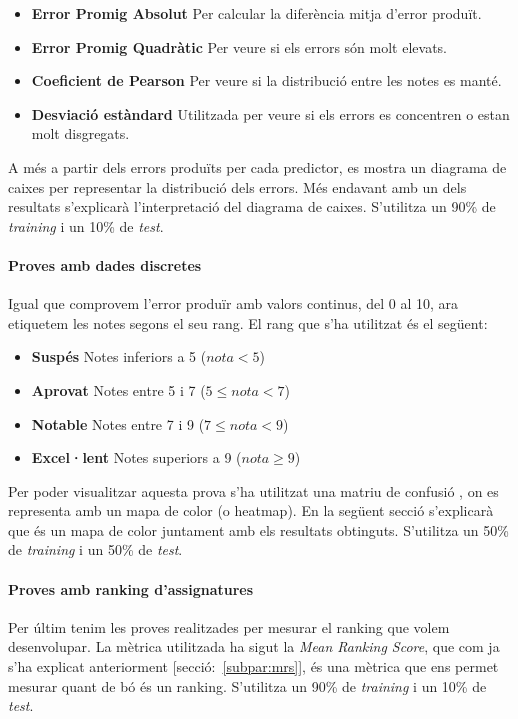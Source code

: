 \documentclass[12pt,a4paper,catalan]{article}
\begin{document}
\begin{itemize}[leftmargin=.5in]
	\item \textbf{Error Promig Absolut} Per calcular la diferència mitja d'error produït.
	\item \textbf{Error Promig Quadràtic} Per veure si els errors són molt elevats.
	\item \textbf{Coeficient de Pearson} Per veure si la distribució entre les notes es manté.
	\item \textbf{Desviació estàndard} Utilitzada per veure si els errors es concentren o estan molt disgregats.
\end{itemize}

A més a partir dels errors produïts per cada predictor, es mostra un diagrama de caixes \cite{boxplot} per representar la distribució dels errors. Més endavant amb un dels resultats s'explicarà l'interpretació del diagrama de caixes. S'utilitza un 90\% de \textit{training} i un 10\% de \textit{test}.


\paragraph{Proves amb dades discretes}
Igual que comprovem l'error produïr amb valors continus, del 0 al 10, ara etiquetem les notes segons el seu rang. El rang que s'ha utilitzat és el següent:

\begin{itemize}[leftmargin=.5in]
	\item \textbf{Suspés} Notes inferiors a 5 ($nota < 5$)
	\item \textbf{Aprovat} Notes entre 5 i 7 ($5 \leq nota < 7 $)
	\item \textbf{Notable} Notes entre 7 i 9 ($7 \leq nota < 9 $)
	\item \textbf{Excel·lent} Notes superiors a 9 ($nota \geq 9$)
\end{itemize}

Per poder visualitzar aquesta prova s'ha utilitzat una matriu de confusió \cite{confusionmatrix}, on es representa amb un mapa de color (o heatmap). En la següent secció s'explicarà que és un mapa de color juntament amb els resultats obtinguts. S'utilitza un 50\% de \textit{training} i un 50\% de \textit{test}.

\paragraph{Proves amb ranking d'assignatures}
Per últim tenim les proves realitzades per mesurar el ranking que volem desenvolupar. La mètrica utilitzada ha sigut la \textit{Mean Ranking Score}, que com ja s'ha explicat anteriorment [secció:~\ref{subpar:mrs}], és una mètrica que ens permet mesurar quant de bó és un ranking. S'utilitza un 90\% de \textit{training} i un 10\% de \textit{test}.
\end{document}
